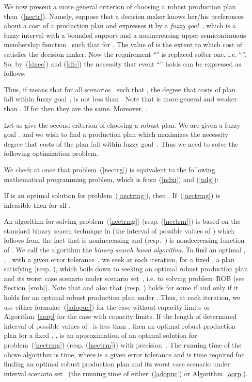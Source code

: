 \documentclass[11pt]{article}
\begin{document}
We now present a more general criterion of choosing a robust production plan than~(\ref{nectr}). Namely,
suppose that a decision maker knows her/his preferences about  
a cost of a production plan
 and expresses it by
a \emph{fuzzy goal}~, which is a fuzzy interval with a bounded support
and a nonincreasing  upper 
semicontinuous membership function~
such that 
for .
The value of  is  the extent to which
cost  of  satisfies the decision maker.
Now the requirement ``"  is replaced softer one, i.e. ``''. 
So, by~(\ref{dnec}) and (\ref{dfc})
the necessity that event ``'' holds can be expressed  as follows:

Thus, if 
means that for all scenarios~
such that , 
the degree that costs of plan~ fall within 
fuzzy goal~,
is not less than . Note that 
is more general  and weaker than . If 
  for  then they are the same. Moreover,
  .
 
Let us give the second criterion of choosing a robust plan.
We are given a fuzzy goal , and we wish to find a production plan
which maximizes the necessity degree that costs of the plan fall within 
fuzzy goal~. Thus we need to solve the following optimization problem,

We check at once that problem~(\ref{nectrg}) 
 is equivalent to the following 
mathematical programming problem, which is from (\ref{ndxi}) and (\ref{ndg}):

If  is an optimal solution
for problem~(\ref{nectrmg}), then .
 If~(\ref{nectrmg}) is
infeasible then 
 for all . 

An algorithm for solving problem~(\ref{nectrmg}) (resp. (\ref{nectrm}))
is based on the standard  binary search 
technique in  (the interval of possible values of )
 which follows from the fact that 
 is nonincreasing and
  (resp.~) is nondecreasing function of . We call
 the algorithm the \emph{binary search based algorithm}.
To find an optimal  , , , with a given 
error tolerance~, we seek
at each iteration, for a fixed ,
a plan  satisfying 
 (resp.
), which boils down to 
seeking an optimal robust production plan  and its worst case scenario
under scenario set~,
i.e. to solving problem~\textsc{ROB} (see Section~\ref{srob}). 
Note that 
and also that 
 (resp.
) holds for some 
 if and only if it holds for an optimal robust production plan under .
Thus, at each iteration, we use  either formulae~(\ref{adopuc}) for the case without capacity limits or
Algorithm~\ref{aorp} for the case with capacity limits.
If the length of determined interval of possible values of~ is less than , then
an optimal robust production plan  for a fixed , ,  is
an approximation of
an optimal solution for
problem~(\ref{nectrmg}) (resp. (\ref{nectrm})) with precision~.
The running time of the above algorithm is
 time, where  is a given
error tolerance and  is  time required 
for finding 
an optimal robust production plan  and its worst case scenario
under interval scenario set~ 
(the running time of either~(\ref{adopuc}) or Algorithm~\ref{aorp}).
\end{document}
